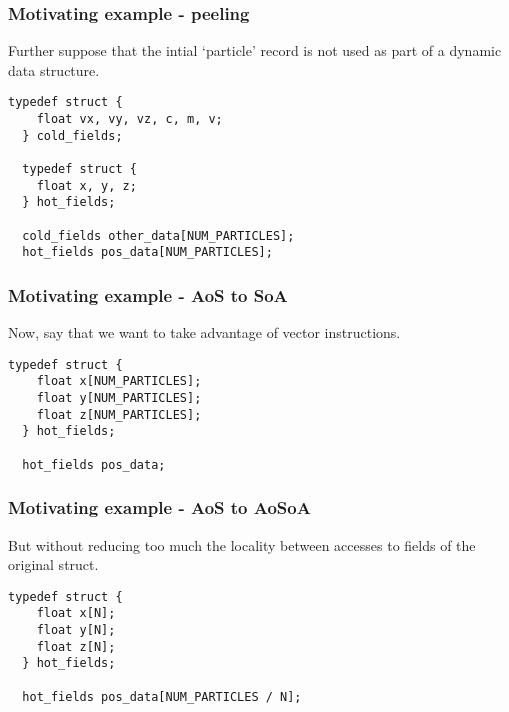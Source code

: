 \begin{frame}[fragile]
\frametitle{Motivating example - peeling}

Further suppose that the intial `particle' record is not used as part of a dynamic data structure.

\begin{lstlisting}[style=Cstyle]
  typedef struct {
    float vx, vy, vz, c, m, v;
  } cold_fields;

  typedef struct {
    float x, y, z;
  } hot_fields;

  cold_fields other_data[NUM_PARTICLES];
  hot_fields pos_data[NUM_PARTICLES];
\end{lstlisting}

\end{frame}

\begin{frame}[fragile]
\frametitle{Motivating example - AoS to SoA}

Now, say that we want to take advantage of vector instructions.

\bigskip

\begin{lstlisting}[style=Cstyle]
  typedef struct {
    float x[NUM_PARTICLES]; 
    float y[NUM_PARTICLES];
    float z[NUM_PARTICLES];
  } hot_fields;

  hot_fields pos_data;
\end{lstlisting}

\end{frame}

\begin{frame}[fragile]
\frametitle{Motivating example - AoS to AoSoA}

But without reducing too much the locality between accesses to fields of the original struct.

\bigskip

\begin{lstlisting}[style=Cstyle]
  typedef struct {
    float x[N]; 
    float y[N];
    float z[N];
  } hot_fields;

  hot_fields pos_data[NUM_PARTICLES / N];
\end{lstlisting}

\end{frame}

